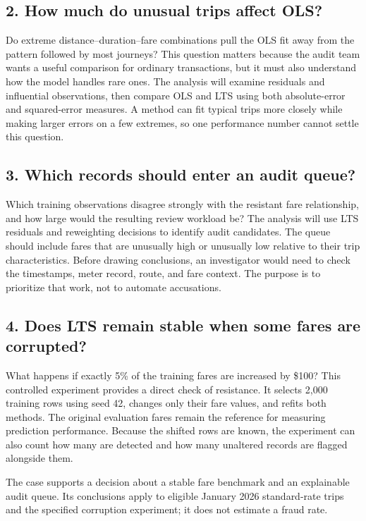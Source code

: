 \documentclass[11pt,letterpaper]{article}
\begin{document}
\subsection*{2. How much do unusual trips affect OLS?}
Do extreme distance--duration--fare combinations pull the OLS fit away from the pattern followed by most journeys? This question matters because the audit team wants a useful comparison for ordinary transactions, but it must also understand how the model handles rare ones. The analysis will examine residuals and influential observations, then compare OLS and LTS using both absolute-error and squared-error measures. A method can fit typical trips more closely while making larger errors on a few extremes, so one performance number cannot settle this question.

\subsection*{3. Which records should enter an audit queue?}
Which training observations disagree strongly with the resistant fare relationship, and how large would the resulting review workload be? The analysis will use LTS residuals and reweighting decisions to identify audit candidates. The queue should include fares that are unusually high or unusually low relative to their trip characteristics. Before drawing conclusions, an investigator would need to check the timestamps, meter record, route, and fare context. The purpose is to prioritize that work, not to automate accusations.

\subsection*{4. Does LTS remain stable when some fares are corrupted?}
What happens if exactly 5\% of the training fares are increased by \$100? This controlled experiment provides a direct check of resistance. It selects 2,000 training rows using seed 42, changes only their fare values, and refits both methods. The original evaluation fares remain the reference for measuring prediction performance. Because the shifted rows are known, the experiment can also count how many are detected and how many unaltered records are flagged alongside them.

The case supports a decision about a stable fare benchmark and an explainable audit queue. Its conclusions apply to eligible January 2026 standard-rate trips and the specified corruption experiment; it does not estimate a fraud rate.
\end{document}

